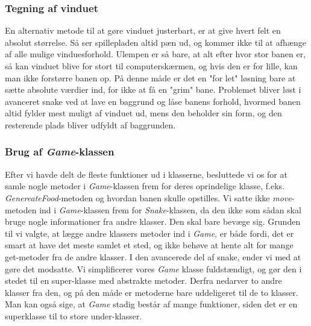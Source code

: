 \subsubsection{Tegning af vinduet}
En alternativ metode til at gøre vinduet justerbart, er at give hvert felt en absolut størrelse. 
Så ser spillepladen altid pæn ud, og kommer ikke til at afhænge af alle mulige vinduesforhold. Ulempen er så bare, at alt efter hvor stor banen er, så kan vinduet blive for stort til computerskærmen, og hvis den er for lille, kan man ikke forstørre banen op. På denne måde er det en "for let" løsning bare at sætte absolute værdier ind, for ikke at få en "grim" bane.
Problemet bliver løst i avanceret snake ved at lave en baggrund og låse banens forhold, hvormed banen altid fylder mest muligt af vinduet ud, mens den beholder sin form, og den resterende plads bliver udfyldt af baggrunden. 

\subsubsection{Brug af \textit{Game}-klassen}
Efter vi havde delt de fleste funktioner ud i klasserne, besluttede vi os for at samle nogle metoder i \textit{Game}-klassen frem for deres oprindelige klasse, f.eks. \textit{GenereateFood}-metoden og hvordan banen skulle opstilles. Vi satte ikke \textit{move}-metoden ind i \textit{Game}-klassen frem for \textit{Snake}-klassen, da den ikke som sådan skal bruge nogle informationer fra andre klasser. Den skal bare bevæge sig.
Grunden til vi valgte, at lægge andre klassers metoder ind i \textit{Game}, er både fordi, det er smart at have det meste samlet et sted, og ikke behøve at hente alt for mange get-metoder fra de andre klasser. 
I den avancerede del af snake, ender vi med at gøre det modsatte. Vi simplificerer vores \textit{Game} klasse fuldstændigt, og gør den i stedet til en super-klasse med abstrakte metoder. Derfra nedarver to andre klasser fra den, og på den måde er metoderne bare uddeligeret til de to klasser. Man kan også sige, at \textit{Game} stadig består af mange funktioner, siden det er en superklasse til to store under-klasser. 